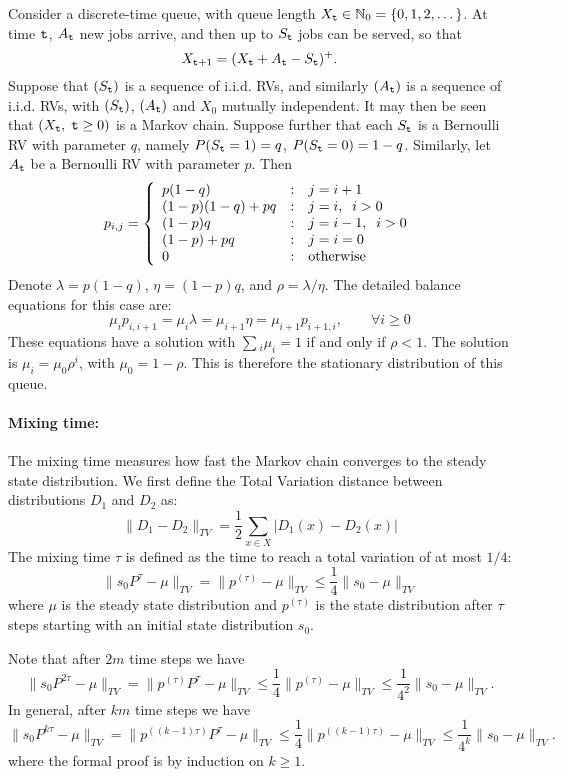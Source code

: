 \begin{example} Consider a discrete-time queue, with queue length $X_{\tt t}\in \mathbb{N}_0=\{0,1,2,\dots\}$. At time  ${\tt t}$, ${A_{\tt t}}$ new jobs arrive, and then up to ${S_{\tt t}}$ jobs can be served, so that
\[{X_{{\tt t} +1}} = {({X_{\tt t}} + {A_{\tt t}} - {S_{\tt t}})^ + }.\]
Suppose that $({S_{\tt t}})$ is a sequence of i.i.d. RVs, and
similarly $({A_{\tt t}})$ is a sequence of i.i.d. RVs, with
$({S_{\tt t}})$, $({A_{\tt t}})$ and ${X_0}$ mutually independent. It
may then be seen that $({X_{\tt t}},\;{\tt t} \ge 0)$ is a Markov chain.
Suppose further that each ${S_{\tt t}}$ is a Bernoulli RV with
parameter $q$, namely $P({S_{\tt t}} = 1) = q$, $P({S_{\tt t}} = 0) =
1 - q$. Similarly, let ${A_{\tt t}}$ be a Bernoulli RV with parameter
$p$. Then
\[{p_{i,j}} = \left\{ {\begin{array}{*{20}{l}}
{p(1 - q)}&:&{j = i + 1}\\
{(1 - p)(1 - q) + pq}&:&{j = i,\;\;i > 0}\\
{(1 - p)q}&:&{j = i - 1,\;\;i > 0}\\
{(1 - p) + pq}&:&{j = i = 0}\\
0&:&{{\rm{otherwise}}}
\end{array}} \right.\]
 Denote $\lambda  = p(1 - q)$, $\eta  = (1 - p)q$, and $\rho  = \lambda /\eta $.   The detailed balance equations for this case are:
\[
\mu_i p_{i,i+1}={\mu _i}\lambda  = {\mu _{i + 1}}\eta=\mu_{i+1}p_{i+1,i} ,\quad \quad \forall i \ge 0\]
These equations have a solution with $\sum {_i{\mu _i} = 1}$ if and
only if $\rho  < 1$. The solution is ${\mu _i} = {\mu _0}{\rho ^i}$,
with ${\mu _0} = 1 - \rho $. This is therefore the stationary
distribution of this queue.
\end{example}


\paragraph{Mixing time:} %
The mixing time measures how fast the Markov chain converges to the steady state distribution. We first define the Total Variation distance between distributions $D_1$ and $D_2$ as:
\[
\|D_1-D_2\|_{TV}=\frac{1}{2}\sum_{x\in X} | D_1 (x) - D_2(x) |
\]
The mixing time $\tau$ is defined as the time to reach a total variation of at most $1/4$:
\[
\|s_0 P^{\tau}-\mu\|_{TV}=\|p^{(\tau)}-\mu\|_{TV}\leq \frac{1}{4}\| s_0-\mu\|_{TV}
\]
where $\mu$ is the steady state distribution and $p^{(\tau)}$ is the state distribution after $\tau$ steps starting with an initial state distribution $s_0$.

Note that after $2m$ time steps we have 
\[
\|s_0 P^{2\tau}-\mu\|_{TV}=\|p^{(\tau)}P^{\tau}-\mu\|_{TV}\leq \frac{1}{4}\| p^{(\tau)}-\mu\|_{TV}\leq \frac{1}{4^2}\| s_0-\mu\|_{TV}.
\]
In general, after $km$ time steps we have 
\[
\|s_0 P^{k\tau}-\mu\|_{TV}=\|p^{((k-1)\tau)}P^{\tau}-\mu\|_{TV}\leq \frac{1}{4}\| p^{((k-1)\tau)}-\mu\|_{TV}\leq \frac{1}{4^k}\| s_0-\mu\|_{TV}.
\]
where the formal proof is by induction on $k\geq1$.

